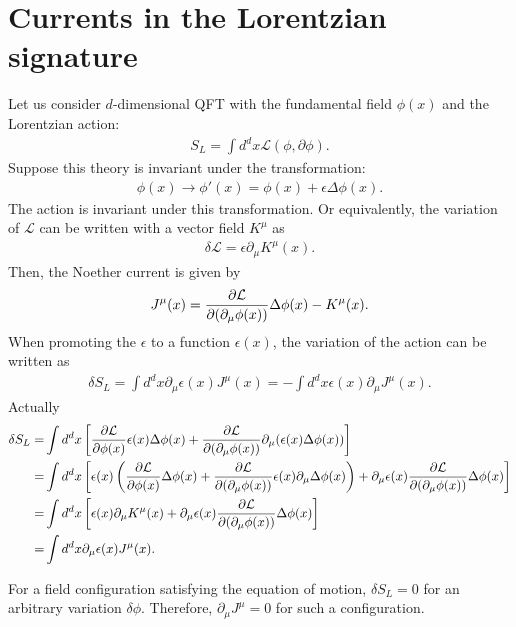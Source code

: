 \documentclass[12pt]{scrartcl}
\newcommand{\del}{\partial}
\newcommand{\Lcal}{\mathcal{L}}
\begin{document}
\section{Currents in the Lorentzian signature}
Let us consider $d$-dimensional QFT with the fundamental field $\phi(x)$ and the Lorentzian action:
\begin{align}
    S_{L}=\int d^d x \Lcal(\phi,\del \phi).
\end{align}
Suppose this theory is invariant under the transformation:
\begin{align}
    \phi(x)\to \phi'(x)=\phi(x)+\epsilon \Delta \phi(x).
\end{align}
The action is invariant under this transformation.  Or equivalently, the variation of $\Lcal$ can be written with a vector field $K^{\mu}$ as
\begin{align}
    \delta \Lcal = \epsilon \del_{\mu}K^{\mu}(x).
\end{align}
Then, the Noether current is given by
\begin{align}
    J^{\mu}(x)=\pdv{\Lcal}{(\del_{\mu}\phi(x))} \Delta \phi(x)-K^{\mu}(x).
\end{align}
When promoting the $\epsilon$ to a function $\epsilon(x)$, the variation of the action can be written as
\begin{align}
    \delta S_{L}=\int d^d x \del_{\mu}\epsilon(x) J^{\mu}(x)=-\int d^d x \epsilon(x) \del_{\mu}J^{\mu}(x).
\end{align}
Actually
\begin{align}
    \delta S_{L}
    =&\int d^d x \left[
        \pdv{\Lcal}{\phi(x)}\epsilon(x)\Delta \phi(x)
        +\pdv{\Lcal}{(\del_{\mu}\phi(x))}\del_{\mu}(\epsilon(x)\Delta \phi(x))
    \right]\nonumber\\
    =&\int d^d x \left[\epsilon(x)\left(
        \pdv{\Lcal}{\phi(x)}\Delta \phi(x)
        +\pdv{\Lcal}{(\del_{\mu}\phi(x))}\epsilon(x)\del_{\mu}\Delta \phi(x)
        \right)
        +\del_{\mu}\epsilon(x)\pdv{\Lcal}{(\del_{\mu}\phi(x))}\Delta \phi(x)
    \right]\nonumber\\
    =&\int d^d x \left[\epsilon(x)\del_{\mu}K^{\mu}(x)
        +\del_{\mu}\epsilon(x)\pdv{\Lcal}{(\del_{\mu}\phi(x))}\Delta \phi(x)
    \right]\nonumber\\
    =&\int d^d x \del_{\mu}\epsilon(x) J^{\mu}(x).\nonumber\\
\end{align}

For a field configuration satisfying the equation of motion, $\delta S_{L}=0$ for an arbitrary variation $\delta \phi$.  Therefore, $\del_{\mu}J^{\mu}=0$ for such a configuration.
\end{document}
